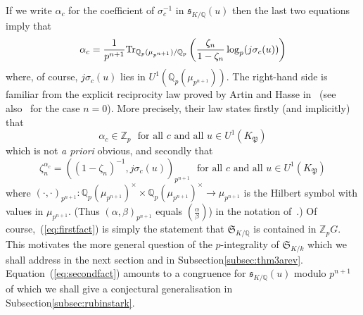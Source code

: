 \documentclass[12pt]{article}
\newcounter{rem}[section]%
\newcommand{\bbQ}{\ensuremath{\mathbb{Q}}}
\newcommand{\bbZ}{\ensuremath{\mathbb{Z}}}
\newcommand{\beql}[1]{\begin{equation}\label{#1}}
\newcommand{\eeq}{\end{equation}}
\newcommand{\fP}{\ensuremath{\mathfrak{P}}}
\newcommand{\fs}{\ensuremath{\mathfrak{s}}}
\newcommand{\fS}{\ensuremath{\mathfrak{S}}}
\newcommand{\inv}{^{-1}}%
\newcommand{\refeq}[1]{~(\ref{eq:#1})}
\newcommand{\rem}{\refstepcounter{rem}\noindent{\sc Remark \therem}}%
\renewcommand{\therem}{\thesection.\arabic{rem}}
\newcommand{\Tr}{{\rm Tr}}
\newcommand{\pnpo}{\ensuremath{{p^{n+1}}}}
\begin{document}
If we write $\alpha_c$ for the coefficient of $\sigma_c\inv$ in $\fs_{K/\bbQ}(u)$ then
the last two equations imply that
\[
\alpha_c=\frac{1}{p^{n+1}}\Tr_{\bbQ_p(\mu_{p^{n+1}})/\bbQ_p}\left(\frac{\zeta_n}{1-\zeta_n}
\log_p(j\sigma_c(u))\right)
\]
where, of course, $j\sigma_c(u)$ lies in $U^1(\bbQ_p(\mu_{p^{n+1}}))$.
The right-hand side is familiar from the explicit reciprocity law proved by
Artin and Hasse in~\cite{AH} (see also~\cite[Thm.~10, Ch.~12]{AT} for the case $n=0$).
More precisely, their law states firstly (and implicitly) that
\beql{eq:firstfact}
\alpha_c\in\bbZ_p\ \ \ \mbox{for all $c$ and all $u\in U^1(K_\fP)$}
\eeq
which is not \emph{a priori} obvious, and secondly that
\beql{eq:secondfact}
\zeta_n^{\alpha_c}=((1-\zeta_n)\inv,j\sigma_c(u))_\pnpo\ \ \
\mbox{for all $c$ and all $u\in U^1(K_\fP)$}
\eeq
where $ (\cdot,\cdot)_\pnpo:\bbQ_p(\mu_\pnpo)^\times\times
\bbQ_p(\mu_\pnpo)^\times\rightarrow\mu_\pnpo$ is the Hilbert symbol with
values in $\mu_\pnpo$. (Thus $(\alpha,\beta)_\pnpo$ equals $(\frac{\alpha}{\beta})$)
in the notation of~\cite{AH}.)
Of course,\refeq{firstfact} is simply the statement that
$\fS_{K/\bbQ}$ is contained in $\bbZ_p G$.
This motivates the more general question of the $p$-integrality
of $\fS_{K/k}$ which we shall address in the next section
and in Subsection\ref{subsec:thm3arev}.
Equation\refeq{secondfact} amounts to a congruence for $\fs_{K/\bbQ}(u)$
modulo $\pnpo$ of which we shall give a conjectural generalisation
in Subsection\ref{subsec:rubinstark}.
\end{document}
